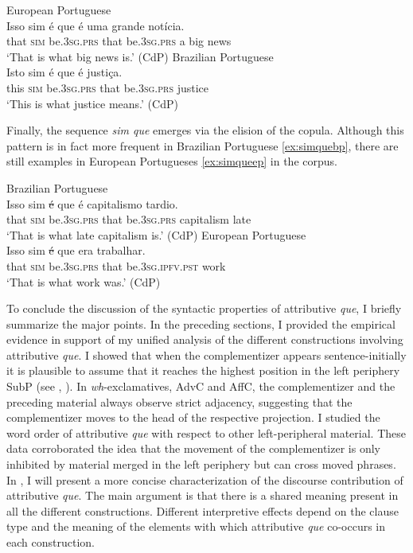 \ea\label{ex:noticia}
\ea European Portuguese \\ \gll 
Isso sim é que é uma grande notícia. \\
that \textsc{sim} be.\textsc{3sg.prs} that be.\textsc{3sg.prs} a big news\\
\glt `That is what big news is.' (CdP)
\ex Brazilian Portuguese\\
\gll 
 Isto sim é que é justiça.\\
this \textsc{sim} be.\textsc{3sg.prs} that be.\textsc{3sg.prs} justice\\
\glt  `This is what justice means.' (CdP)
\z 
\z 



Finally, the sequence \emph{sim que}  emerges  via the elision of the copula. Although this pattern is in fact more frequent in Brazilian Portuguese \eqref{ex:simquebp}, there are still examples  in European Portugueses \eqref{ex:simqueep} in the corpus.

\ea
\ea\label{ex:simquebp} 
Brazilian Portuguese \\
\gll Isso sim \sout{é} que é capitalismo tardio.\\
that \textsc{sim} be.\textsc{3sg.prs} that be.\textsc{3sg.prs} capitalism late\\
\glt `That is what late capitalism is.'  (CdP)
\ex\label{ex:simqueep}
European Portuguese \\
\gll 
 Isso sim  \sout{é} que era trabalhar. \\
that \textsc{sim} be.\textsc{3sg.prs} that be.\textsc{3sg.ipfv.pst} work\\
\glt `That is what work was.' (CdP)
\z
\z 



To conclude the discussion of the syntactic properties of attributive \emph{que}, I briefly summarize the major points. In the preceding sections, I provided the empirical evidence in support of my unified analysis of the different constructions involving attributive \emph{que}. I showed that when the complementizer appears sentence-initially it is plausible to assume that it reaches the highest position in the left periphery SubP (see , ). In \textit{wh}-exclamatives, AdvC and AffC, the complementizer and the preceding material always observe strict adjacency, suggesting that the complementizer moves to the head of the respective projection.  I studied the  word order of attributive \emph{que} with respect to other left-peripheral material. These data corroborated the idea  that the movement of the complementizer is only inhibited by material merged in the left periphery but can cross moved phrases.  In , I will present a more concise characterization of the discourse contribution of attributive \emph{que}. The main argument is that there is a shared   meaning present in all the different constructions. Different interpretive effects depend on the clause type and the meaning of the elements with which attributive \emph{que} co-occurs in each construction.
 
